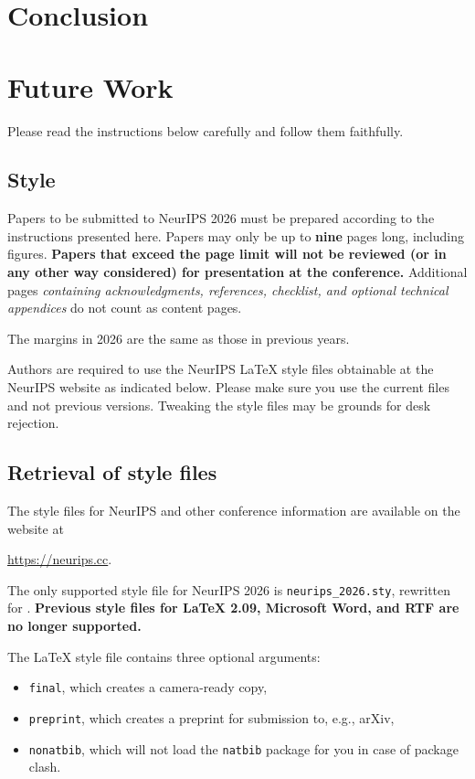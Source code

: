 \documentclass{article}
\begin{document}
\section{Conclusion}

\section{Future Work}


Please read the instructions below carefully and follow them faithfully.


\subsection{Style}


Papers to be submitted to NeurIPS 2026 must be prepared according to the
instructions presented here. Papers may only be up to {\bf nine} pages long, including figures. \textbf{Papers that exceed the page limit will not be reviewed (or in any other way considered) for presentation at the conference.}
Additional pages \emph{containing acknowledgments, references, checklist, and optional technical appendices} do not count as content pages. 


The margins in 2026 are the same as those in previous years.


Authors are required to use the NeurIPS \LaTeX{} style files obtainable at the NeurIPS website as indicated below. Please make sure you use the current files and not previous versions. Tweaking the style files may be grounds for desk rejection.


\subsection{Retrieval of style files}


The style files for NeurIPS and other conference information are available on the website at
\begin{center}
  \url{https://neurips.cc}.
\end{center}


The only supported style file for NeurIPS 2026 is \verb+neurips_2026.sty+, rewritten for \LaTeXe{}. \textbf{Previous style files for \LaTeX{} 2.09,  Microsoft Word, and RTF are no longer supported.}


The \LaTeX{} style file contains three optional arguments: 
\begin{itemize}
\item \verb+final+, which creates a camera-ready copy, 
\item \verb+preprint+, which creates a preprint for submission to, e.g., arXiv, \item \verb+nonatbib+, which will not load the \verb+natbib+ package for you in case of package clash.
\end{itemize}
\end{document}
